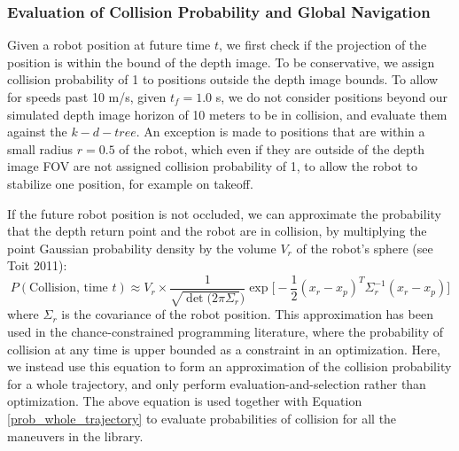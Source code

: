 \documentclass{llncs}
\begin{document}


\subsubsection{Evaluation of Collision Probability and Global Navigation}

Given a robot position at future time $t$, we first check if the projection of the position is within the bound of the depth image.  To be conservative, we assign collision probability of 1 to positions outside the depth image bounds.  To allow for speeds past 10 m/s, given $t_f = 1.0$ s, we do not consider positions beyond our simulated depth image horizon of 10 meters to be in collision, and evaluate them against the $k-d-tree$.  An exception is made to positions that are within a small radius $r = 0.5$ of the robot, which even if they are outside of the depth image FOV are not assigned collision probability of 1, to allow the robot to stabilize one position, for example on takeoff.  

If the future robot position is not occluded, we can approximate the probability that the depth return point and the robot are in collision, by multiplying the point Gaussian probability density by the volume $V_r$ of the robot's sphere (see Toit 2011):
%
\begin{equation}
    \label{prob_one_point}
    P(\text{Collision, time } t) \approx V_r \times \frac{1}{\sqrt{\det (2 \pi \Sigma_r})} \exp \big[ - \frac{1}{2} (x_r - x_p)^T \Sigma_r^{-1} (x_r - x_p) \big]
\end{equation}
%
where $\Sigma_r$ is the covariance of the robot position.  This approximation has been used in the chance-constrained programming literature, where the probability of collision at any time is upper bounded as a constraint in an optimization.   Here, we instead use this equation to form an approximation of the collision probability for a whole trajectory, and only perform evaluation-and-selection rather than optimization.  The above equation is used together with Equation \ref{prob_whole_trajectory} to evaluate probabilities of collision for all the maneuvers in the library. 
\end{document}
